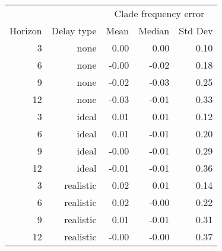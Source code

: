 
\begin{tabular*}{0.7\textwidth}{rrrrr}
\toprule
        &            & \multicolumn{3}{c}{Clade frequency error} \\
Horizon & Delay type & Mean & Median & Std Dev \\
\midrule

3 & none & 0.00 & 0.00 & 0.10 \\
6 & none & -0.00 & -0.02 & 0.18 \\
9 & none & -0.02 & -0.03 & 0.25 \\
12 & none & -0.03 & -0.01 & 0.33 \\
3 & ideal & 0.01 & 0.01 & 0.12 \\
6 & ideal & 0.01 & -0.01 & 0.20 \\
9 & ideal & -0.00 & -0.01 & 0.29 \\
12 & ideal & -0.01 & -0.01 & 0.36 \\
3 & realistic & 0.02 & 0.01 & 0.14 \\
6 & realistic & 0.02 & -0.00 & 0.22 \\
9 & realistic & 0.01 & -0.01 & 0.31 \\
12 & realistic & -0.00 & -0.00 & 0.37 \\

\bottomrule
\end{tabular*}


